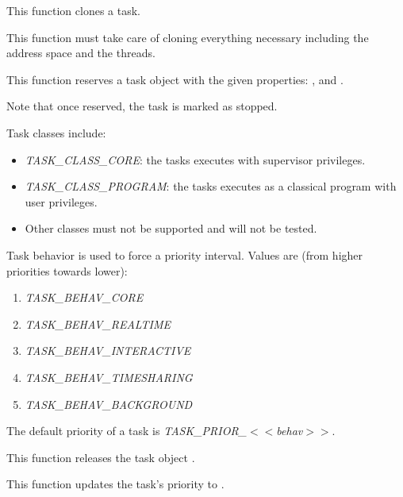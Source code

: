 \begin{itemize}
	 {
	   This function clones a task.

	   This function must take care of cloning everything necessary
	   including the address space and the threads.
	 }

	 {
	   This function reserves a task object with the given
	   properties: ,  and
	   .

	   Note that once reserved, the task is marked as stopped.

	   Task classes include:

	   \begin{itemize}
	     \item
	       \emph{TASK\_CLASS\_CORE}: the tasks executes with
	       supervisor privileges.
	     \item
	       \emph{TASK\_CLASS\_PROGRAM}: the tasks executes as a
	       classical program with user privileges.
	     \item
	       Other classes must not be supported and will not be
	       tested.
	   \end{itemize}

	   Task behavior is used to force a priority interval. Values
	   are (from higher priorities towards lower):

	   \begin{enumerate}
	     \item \emph{TASK\_BEHAV\_CORE}
	     \item \emph{TASK\_BEHAV\_REALTIME}
	     \item \emph{TASK\_BEHAV\_INTERACTIVE}
	     \item \emph{TASK\_BEHAV\_TIMESHARING}
	     \item \emph{TASK\_BEHAV\_BACKGROUND}
	   \end{enumerate}

	   The default priority of a task is
	   \emph{TASK\_PRIOR\_$<<$behav$>>$}.
	 }

\newpage

	 {
	   This function releases the task object .
	 }

	 {
	   This function updates the task's priority to .

}
\end{itemize}
